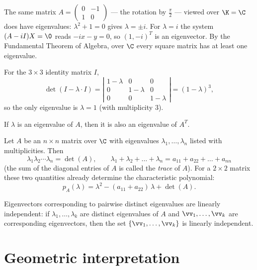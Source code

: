 \begin{example}
The same matrix $A = \left( \begin{smallmatrix} 0 & -1\\ 1 & 0 \end{smallmatrix} \right)$ — the rotation by
$\tfrac\pi2$ — viewed over $\K = \C$ does have eigenvalues: $\lambda^2+1 = 0$ gives $\lambda = \pm i$. For
$\lambda = i$ the system $(A-iI)X=\0$ reads $-ix - y = 0$, so $(1,-i)^T$ is an eigenvector. By the
Fundamental Theorem of Algebra, over $\C$ every square matrix has at least one eigenvalue.
\end{example}

\begin{example}
For the $3\times 3$ identity matrix $I$,
\[
\det(I-\lambda\cdot I) = \left| \begin{array}{ccc} 1-\lambda & 0 & 0\\ 0 & 1-\lambda & 0 \\ 0 & 0 & 1-\lambda \end{array} \right| = (1-\lambda)^3,
\]
so the only eigenvalue is $\lambda = 1$ (with multiplicity $3$).
\end{example}

\begin{fact}
If $\lambda$ is an eigenvalue of $A$, then it is also an eigenvalue of $A^T$.
\end{fact}

\begin{fact}
Let $A$ be an $n\times n$ matrix over $\C$ with eigenvalues $\lambda_1,\ldots,\lambda_n$ listed with
multiplicities. Then
\[
\lambda_1 \lambda_2 \cdots \lambda_n = \det(A), \qquad
\lambda_1+ \lambda_2 +\ldots+ \lambda_n = a_{11}+a_{22}+\ldots+a_{nn}
\]
(the sum of the diagonal entries of $A$ is called the \emph{trace} of $A$). For a $2\times 2$ matrix these
two quantities already determine the characteristic polynomial:
\[
p_A(\lambda) = \lambda^2 - (a_{11}+a_{22})\,\lambda + \det(A).
\]
\end{fact}

\begin{theorem}
Eigenvectors corresponding to pairwise distinct eigenvalues are linearly independent: if
$\lambda_1,\ldots,\lambda_k$ are distinct eigenvalues of $A$ and $\vv_1,\ldots,\vv_k$ are corresponding
eigenvectors, then the set $\{\vv_1,\ldots,\vv_k\}$ is linearly independent.
\end{theorem}

\section{Geometric interpretation}


